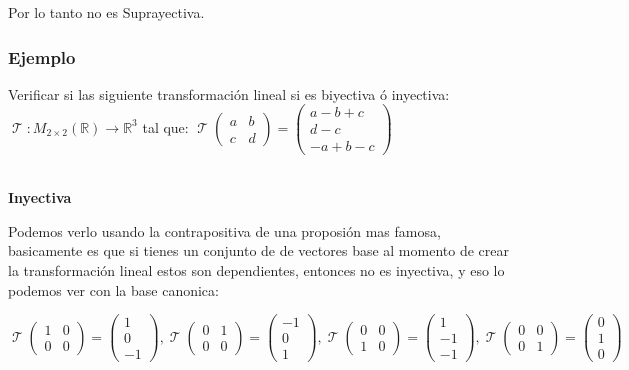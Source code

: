 \documentclass[12pt]{report}                                %
\DeclareMathOperator \LinealTransformation {\mathcal{T}}
\begin{document}
            Por lo tanto no es Suprayectiva.


            \clearpage
            \subsubsection{Ejemplo}
            Verificar si las siguiente transformación lineal si es biyectiva ó inyectiva:
            $\LinealTransformation : M_{2 \times 2}(\mathbb{R}) \to \mathbb{R}^3$ tal que: 
            $\LinealTransformation(\begin{matrix}a&b\\c&d\end{matrix}) = \begin{pmatrix}a-b+c\\d-c\\-a+b-c\end{pmatrix}$

            \textbf{\\Inyectiva}

            Podemos verlo usando la contrapositiva de una proposión mas famosa, basicamente es que si
            tienes un conjunto de de vectores base al momento de crear la transformación lineal estos son dependientes, 
            entonces no es inyectiva, y eso lo podemos ver con la base canonica:

            \begin{equation*}
                \LinealTransformation(\begin{matrix}1&0\\0&0\end{matrix}) = \begin{pmatrix}1\\0\\-1\end{pmatrix}, 
                \LinealTransformation(\begin{matrix}0&1\\0&0\end{matrix}) = \begin{pmatrix}-1\\0\\1\end{pmatrix}, 
                \LinealTransformation(\begin{matrix}0&0\\1&0\end{matrix}) = \begin{pmatrix}1\\-1\\-1\end{pmatrix}, 
                \LinealTransformation(\begin{matrix}0&0\\0&1\end{matrix}) = \begin{pmatrix}0\\1\\0\end{pmatrix} 
            \end{equation*}
\end{document}
